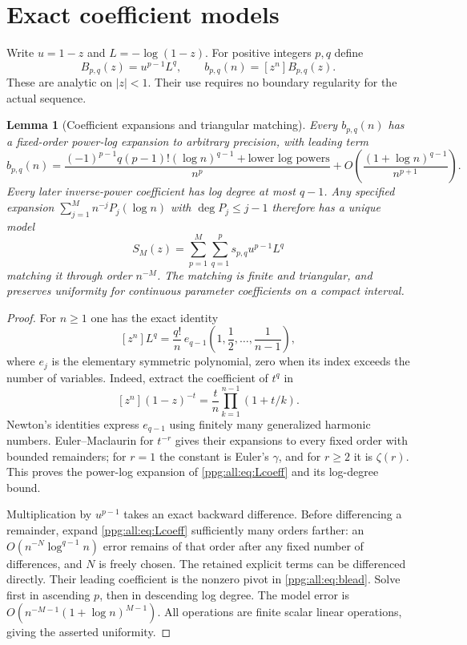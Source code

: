 \documentclass[11pt,letterpaper]{article}
\newtheorem{lemma}[theorem]{Lemma}
\theoremstyle{remark}\newtheorem{remark}[theorem]{Remark}
\numberwithin{equation}{section}
\begin{document}
\section{Exact coefficient models}\label{ppg:all:sec:models}
Write $u=1-z$ and $L=-\log(1-z)$. For positive integers $p,q$ define
\[
 B_{p,q}(z)=u^{p-1}L^q,\qquad b_{p,q}(n)=[z^n]B_{p,q}(z).
\]
These are analytic on $|z|<1$. Their use requires no boundary regularity for the actual sequence.

\begin{lemma}[Coefficient expansions and triangular matching]\label{ppg:all:lem:basis}
Every $b_{p,q}(n)$ has a fixed-order power-log expansion to arbitrary precision, with leading term
\begin{equation}\label{ppg:all:eq:blead}
 b_{p,q}(n)=\frac{(-1)^{p-1}q(p-1)!(\log n)^{q-1}
                 +\text{lower log powers}}{n^p}
       +O\!\left(\frac{(1+\log n)^{q-1}}{n^{p+1}}\right).
\end{equation}
Every later inverse-power coefficient has log degree at most $q-1$. Any specified expansion $\sum_{j=1}^M n^{-j}P_j(\log n)$ with $\deg P_j\le j-1$ therefore has a unique model
\begin{equation}\label{ppg:all:eq:canonical}
 S_M(z)=\sum_{p=1}^M\sum_{q=1}^p s_{p,q}u^{p-1}L^q
\end{equation}
matching it through order $n^{-M}$. The matching is finite and triangular, and preserves uniformity for continuous parameter coefficients on a compact interval.
\end{lemma}
\begin{proof}
For $n\ge1$ one has the exact identity
\begin{equation}\label{ppg:all:eq:Lcoeff}
 [z^n]L^q=\frac{q!}{n}\,
 e_{q-1}\left(1,\frac12,\ldots,\frac1{n-1}\right),
\end{equation}
where $e_j$ is the elementary symmetric polynomial, zero when its index exceeds the number of variables. Indeed, extract the coefficient of $t^q$ in
\[
 [z^n](1-z)^{-t}=\frac t n\prod_{k=1}^{n-1}(1+t/k).
\]
Newton's identities express $e_{q-1}$ using finitely many generalized harmonic numbers. Euler--Maclaurin for $t^{-r}$ gives their expansions to every fixed order with bounded remainders; for $r=1$ the constant is Euler's $\gamma$, and for $r\ge2$ it is $\zeta(r)$. This proves the power-log expansion of \eqref{ppg:all:eq:Lcoeff} and its log-degree bound.

Multiplication by $u^{p-1}$ takes an exact backward difference. Before differencing a remainder, expand \eqref{ppg:all:eq:Lcoeff} sufficiently many orders farther: an $O(n^{-N}\log^{q-1}n)$ error remains of that order after any fixed number of differences, and $N$ is freely chosen. The retained explicit terms can be differenced directly. Their leading coefficient is the nonzero pivot in \eqref{ppg:all:eq:blead}. Solve first in ascending $p$, then in descending log degree. The model error is $O(n^{-M-1}(1+\log n)^{M-1})$. All operations are finite scalar linear operations, giving the asserted uniformity.
\end{proof}
\end{document}
